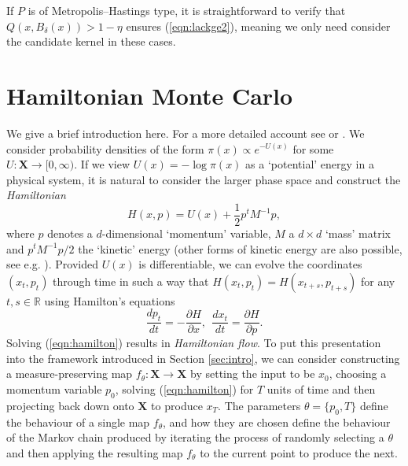\documentclass[bj,numbers,noshowframe]{imsart}
\newcommand{\X}{\mathbf{X}}
\theoremstyle{definition}
\theoremstyle{plain}
\theoremstyle{definition}
\begin{document}
If $P$ is of Metropolis--Hastings type, it is straightforward to verify that $Q(x,B_\delta(x)) > 1- \eta$ ensures (\ref{eqn:lackge2}), meaning we only need consider the candidate kernel in these cases.

\section{Hamiltonian Monte Carlo}
\label{sec:hmc}

We give a brief introduction here.  For a more detailed account see \citep{neal2011mcmc} or \citep{betancourt2014geometric}.  We consider probability densities of the form $\pi(x) \propto e^{-U(x)}$ for some $U:\X \to [0,\infty)$.  If we view $U(x)= -\log\pi(x)$ as a `potential' energy in a physical system, it is natural to consider the larger phase space and construct the \emph{Hamiltonian}
\begin{equation} \label{eqn:hamiltonian}
H(x,p) = U(x) + \frac{1}{2}p^t M^{-1} p,
\end{equation}
where $p$ denotes a $d$-dimensional `momentum' variable, $M$ a $d \times d$ `mass' matrix and $p^t M^{-1}p/2$ the `kinetic' energy (other forms of kinetic energy are also possible, see e.g. \citep{girolami2011riemann}).  Provided $U(x)$ is differentiable, we can evolve the coordinates $(x_t,p_t)$ through time in such a way that $H(x_t,p_t) = H(x_{t+s},p_{t+s})$ for any $t,s \in \mathbb{R}$ using Hamilton's equations
\begin{equation} \label{eqn:hamilton}
\frac{d p_t}{dt} = -\frac{\partial H}{\partial x}, ~~ \frac{dx_t}{dt} = \frac{\partial H}{\partial p}.
\end{equation}
Solving (\ref{eqn:hamilton}) results in \emph{Hamiltonian flow}.  To put this presentation into the framework introduced in Section \ref{sec:intro}, we can consider constructing a measure-preserving map $f_\theta:\X \to \X$ by setting the input to be $x_0$, choosing a momentum variable $p_0$, solving (\ref{eqn:hamilton}) for $T$ units of time and then projecting back down onto $\X$ to produce $x_T$.  The parameters $\theta = \{p_0,T\}$ define the behaviour of a single map $f_\theta$, and how they are chosen define the behaviour of the Markov chain produced by iterating the process of randomly selecting a $\theta$ and then applying the resulting map $f_\theta$ to the current point to produce the next.
\end{document}

